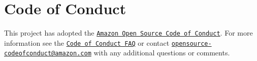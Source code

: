 \chapter{Code of Conduct }
\hypertarget{md__2home_2samuisa_2Desktop_2COGAR__cb_2ros2__ws_2src_2aws-robomaker-small-house-world_2CODE__OF__CONDUCT}{}\label{md__2home_2samuisa_2Desktop_2COGAR__cb_2ros2__ws_2src_2aws-robomaker-small-house-world_2CODE__OF__CONDUCT}
\label{md__2home_2samuisa_2Desktop_2COGAR__cb_2ros2__ws_2src_2aws-robomaker-small-house-world_2CODE__OF__CONDUCT_autotoc_md7}%
%


This project has adopted the \href{https://aws.github.io/code-of-conduct}{\texttt{Amazon Open Source Code of Conduct}}. For more information see the \href{https://aws.github.io/code-of-conduct-faq}{\texttt{Code of Conduct FAQ}} or contact \href{mailto:opensource-codeofconduct@amazon.com}{\texttt{opensource-\/codeofconduct@amazon.\+com}} with any additional questions or comments. 